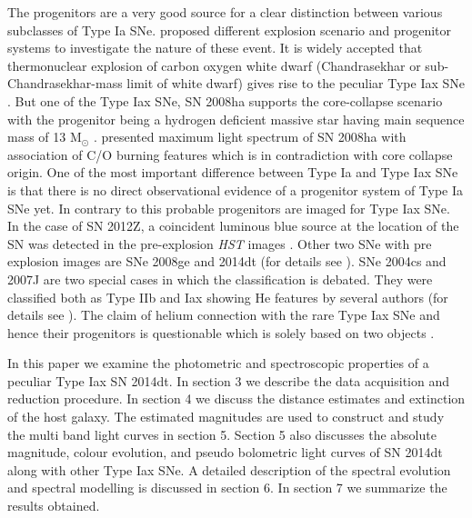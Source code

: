 \documentclass[fleqn,usenatbib]{mnras}
\begin{document}
The progenitors are a very good source for a clear distinction between various subclasses of Type Ia SNe. \cite{2015ApJ...808..138L} proposed different explosion scenario and progenitor systems to investigate the nature of these event. It is widely accepted that thermonuclear explosion of carbon oxygen white dwarf (Chandrasekhar or sub-Chandrasekhar-mass limit of white dwarf) gives rise to the peculiar Type Iax SNe \citep{2009AJ....138..376F,2012ApJ...761L..23J,2013MNRAS.429.2287K,2014MNRAS.438.1762F,2015A&A...573A...2S,2015MNRAS.450.3045K,2015A&A...574A..12L}. But one of the Type Iax SNe, SN 2008ha supports the core-collapse scenario with the progenitor being a hydrogen deficient massive star having main sequence mass of 13 M$_{\odot}$ \citep{2009Natur.459..674V,2010ApJ...719.1445M}. \cite{2009AJ....138..376F,2010ApJ...708L..61F} presented maximum light spectrum of SN 2008ha with association of C/O burning features which is in contradiction with core collapse origin. One of the most important difference between Type Ia and Type Iax SNe is that there is no direct observational evidence of a progenitor system of Type Ia SNe yet. In contrary to this probable progenitors are imaged for Type Iax SNe. In the case of SN 2012Z, a coincident luminous blue source at the location of the SN was detected in the pre-explosion {\it HST} images \citep{2014Natur.512...54M}. Other two SNe with pre explosion images are SNe 2008ge and 2014dt (for details see \cite{2010AJ....140.1321F,2015ApJ...798L..37F}). SNe 2004cs and 2007J are two special cases in which the classification is debated. They were classified both as Type IIb and Iax showing He features by several authors (for details see \cite{2005PASP..117..132R,2007CBET..809....1L,2007CBET..817....1F,2007CBET..926....1F,2009AJ....138..376F,2013ApJ...767...57F,2015ApJ...799...52W}). The claim of helium connection with the rare Type Iax SNe and hence their progenitors is questionable which is solely based on two objects \citep{2015ApJ...799...52W}.
     
In this paper we examine the photometric and spectroscopic properties of a peculiar Type Iax SN 2014dt. In section 3 we describe the data acquisition and reduction procedure. In section 4 we discuss the distance estimates and extinction of the host galaxy. The estimated magnitudes are used to construct and study the multi band light curves in section 5. Section 5 also discusses the absolute magnitude, colour evolution, and pseudo bolometric light curves of SN 2014dt along with other Type Iax SNe. A detailed description of the spectral evolution and spectral modelling is discussed in section 6. In section 7 we summarize the results obtained.
 
\end{document}
